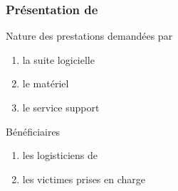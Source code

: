  \begin{frame}
 \frametitle {Présentation de \mo}
 \begin{block}{Nature des prestations demandées par \mo}
  
 \begin{enumerate}
 \item la suite logicielle 
 \item le matériel 
 \item le service support
 \end{enumerate}
 \end{block}
 \pause 
 \begin{block}{Bénéficiaires}
 \begin{enumerate}
 \item les logisticiens de \mo
 \item les victimes prises en charge
 \end{enumerate}
 \end{block}
 \end{frame}
